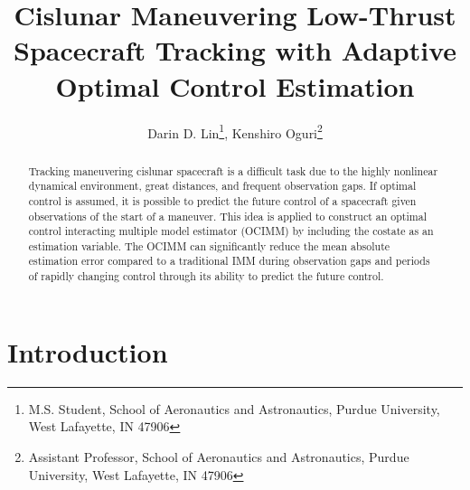 \documentclass[letterpaper, preprint, paper,11pt]{AAS}	%
\begin{document}
\title{Cislunar Maneuvering Low-Thrust Spacecraft Tracking with Adaptive Optimal Control Estimation}

\author{Darin D. Lin\thanks{M.S. Student, School of Aeronautics and Astronautics, Purdue University, West Lafayette, IN 47906},  
Kenshiro Oguri\thanks{Assistant Professor, School of Aeronautics and Astronautics, Purdue University, West Lafayette, IN 47906}}


\maketitle{} 		


\begin{abstract}
Tracking maneuvering cislunar spacecraft is a difficult task due to the highly nonlinear dynamical environment, great distances, and frequent observation gaps. If optimal control is assumed, it is possible to predict the future control of a spacecraft given observations of the start of a maneuver. This idea is applied to construct an optimal control interacting multiple model estimator (OCIMM) by including the costate as an estimation variable. The OCIMM can significantly reduce the mean absolute estimation error compared to a traditional IMM during observation gaps and periods of rapidly changing control through its ability to predict the future control. 
\end{abstract}


\section{Introduction}

\end{document}
